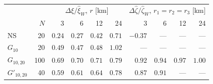 \begin{tabular}{lrrrrrrrrr}
\toprule
& & \multicolumn{4}{c}{$\Delta\hat\xi / \hat\xi_W$, $r$ [km]} & \multicolumn{4}{c}{$\Delta\hat\zeta / \hat\zeta_W$, $r_1 = r_2 = r_3$ [km]} \\
& $N$ & 3 & 6 & 12 & 24 & 3 & 6 & 12 & 24 \\
\midrule
NS & 20 & $0.24$ & $0.27$ & $0.42$ & $0.71$ & $-0.37$ & — & — & — \\
$G_{10}$ & 20 & $0.49$ & $0.47$ & $0.48$ & $1.02$ & — & — & — & — \\
$G_{10,20}$ & 100 & $0.69$ & $0.70$ & $0.71$ & $0.79$ & $0.92$ & $0.94$ & $0.97$ & $1.00$ \\
$G'_{10,20}$ & 40 & $0.59$ & $0.61$ & $0.64$ & $0.78$ & $0.87$ & $0.91$ & — & — \\
\bottomrule
\end{tabular}
